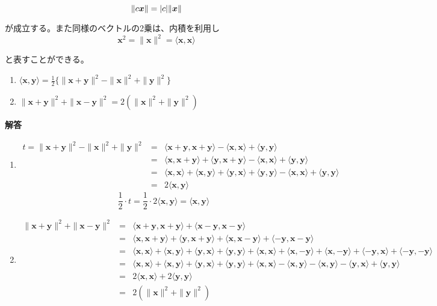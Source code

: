 \documentclass[dvipdfmx,autodetect-engine]{jsarticle}
\newcommand{\innerProduct}[2]{\langle \bm{#1}, \bm{#2} \rangle}
\newcommand{\nrm}[1]{\|\bm{#1}\|}
\DeclarePairedDelimiter{\abs}{\lvert}{\rvert}
\begin{document}
$$
\|c\bm{x}\| = \abs{c}\|\bm{x}\|
$$

が成立する。また同様のベクトルの2乗は、内積を利用し
$$
\bm{x}^2  = \nrm{x}^2 = \innerProduct{x}{x}
$$

と表すことができる。


\begin{enumerate}
\renewcommand{\labelenumi}{(\arabic{enumi})}
\item $\innerProduct{x}{y} = \frac{1}{2}\{ \|\bm{x} + \bm{y}\|^2 - \|\bm{x}\|^2 + \|\bm{y}\|^2 \}$
\item $\|\bm{x} + \bm{y}\|^2 + \|\bm{x} - \bm{y}\|^2 = 2(\|\bm{x}\|^2 + \|\bm{y}\|^2)$
\end{enumerate}

{\bf 解答}

\begin{enumerate}
\renewcommand{\labelenumi}{(\arabic{enumi})}

\item \begin{eqnarray*}
t = \|\bm{x} + \bm{y}\|^2 - \|\bm{x}\|^2 + \|\bm{y}\|^2 &= &\langle \bm{x} + \bm{y}, \bm{x} + \bm{y} \rangle - \innerProduct{x}{x} +\innerProduct{y}{y} \\
&= &\langle \bm{x}, \bm{x} + \bm{y} \rangle + \langle \bm{y}, \bm{x} + \bm{y} \rangle - \innerProduct{x}{x} +\innerProduct{y}{y} \\
&= &\innerProduct{x}{x} +\innerProduct{x}{y} + \innerProduct{y}{x} +\innerProduct{y}{y} - \innerProduct{x}{x} +\innerProduct{y}{y} \\
&= & 2 \innerProduct{x}{y}
\end{eqnarray*}
$$
\frac{1}{2} \cdot t = \frac{1}{2} \cdot 2\innerProduct{x}{y} = \innerProduct{x}{y}
$$

\item 
\begin{eqnarray*}
\|\bm{x} + \bm{y}\|^2 + \|\bm{x} - \bm{y}\|^2 &= &\langle \bm{x} + \bm{y}, \bm{x} + \bm{y} \rangle + \langle \bm{x} - \bm{y}, \bm{x} - \bm{y} \rangle \\
&= &\langle \bm{x}, \bm{x} + \bm{y} \rangle + \langle \bm{y}, \bm{x} + \bm{y} \rangle + \langle \bm{x}, \bm{x} - \bm{y} \rangle + \langle -\bm{y}, \bm{x} - \bm{y} \rangle \\
&= &\innerProduct{x}{x} + \innerProduct{x}{y} + \innerProduct{y}{x} + \innerProduct{y}{y} + \innerProduct{x}{x} + \innerProduct{x}{-y} + \innerProduct{x}{-y} + \innerProduct{-y}{x} + \innerProduct{-y}{-y} \\
&= &\innerProduct{x}{x} + \innerProduct{x}{y} + \innerProduct{y}{x} + \innerProduct{y}{y} + \innerProduct{x}{x} - \innerProduct{x}{y} - \innerProduct{x}{y} - \innerProduct{y}{x} + \innerProduct{y}{y} \\
&=& 2\innerProduct{x}{x} + 2 \innerProduct{y}{y} \\
&=& 2(\|\bm{x}\|^2 + \|\bm{y}\|^2)
\end{eqnarray*}

\end{enumerate}
\end{document}
